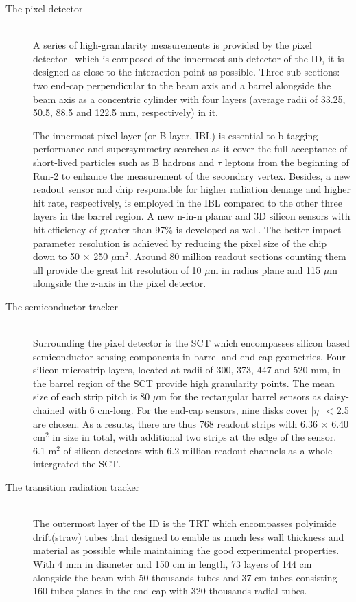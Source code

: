 \documentclass[UTF8,12pt]{ctexart}
\numberwithin{equation}{section}
\def\abseta{$|$$\eta$$|$~}
\begin{document}
\begin{description}
 \item[The pixel detector] \mbox{} \\
A series of high-granularity measurements is provided by the pixel detector~\cite{PIX-2018-001} which is composed of the innermost sub-detector of the ID, it is designed as close to the interaction point as possible. Three sub-sections: two end-cap perpendicular to the beam axis and a barrel alongside the beam axis as a concentric cylinder with four layers (average radii of 33.25, 50.5, 88.5 and 122.5 mm, respectively) in it. 

The innermost pixel layer (or B-layer, IBL) is essential to b-tagging performance and supersymmetry searches as it cover the full acceptance of short-lived particles such as B hadrons and $\tau$ leptons from the beginning of Run-2 to enhance the measurement of the secondary vertex. Besides, a new readout sensor and chip responsible for higher radiation demage and higher hit rate, respectively, is employed in the IBL compared to the other three layers in the barrel region. A new  n-in-n planar and 3D silicon sensors with hit efficiency of greater than 97\% is developed as well. The better impact parameter resolution is achieved by reducing the pixel size of the chip down to 50 $\times$ 250 $\mu$m$^2$.  Around 80 million readout sections counting them all provide the great  hit resolution of 10 $\mu$m in radius plane and 115 $\mu$m alongside the z-axis in the pixel detector.

 \item[The semiconductor tracker] \mbox{} \\
 Surrounding the pixel detector is the SCT which encompasses silicon based semiconductor sensing components in barrel and end-cap geometries. Four silicon microstrip layers, located at radii of 300, 373, 447 and 520 mm, in the barrel region of the SCT provide high granularity points. The mean size of each strip pitch is 80 $\mu$m for the rectangular barrel sensors as daisy-chained with 6 cm-long. For the end-cap sensors, nine disks cover \abseta  < 2.5 are chosen. As a results, there are thus 768 readout strips with 6.36 $\times$ 6.40  cm$^2$ in size in total, with additional two strips at the edge of the sensor. 6.1 m$^2$ of silicon detectors with 6.2 million readout channels as a whole intergrated the SCT. 
 
 \item[The transition radiation tracker] \mbox{} \\
 The outermost layer of the ID is the TRT which encompasses polyimide drift(straw) tubes that designed to enable as much less wall thickness and material as possible while maintaining the good experimental properties. With 4 mm in diameter and 150 cm in length, 73 layers of 144 cm alongside the beam with 50 thousands tubes and 37 cm tubes consisting 160 tubes planes in the end-cap with 320 thousands radial tubes.
 

\end{description}
\end{document}

